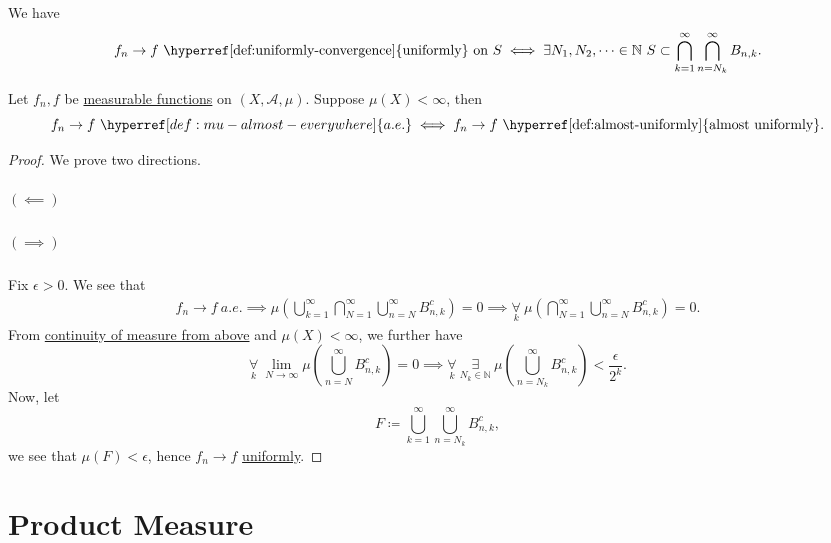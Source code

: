 \begin{lemma}
	We have
	\[
		f_{n}\to f \text{ \hyperref[def:uniformly-convergence]{uniformly} on } S \iff \exists N_1, N_2, \dots\in \mathbb{N}\ S\subset \bigcap_{k=1}^{\infty} \bigcap_{n=N_k}^{\infty} B_{n, k}.
	\]
\end{lemma}

\begin{theorem}\label{thm:Egorov}
	Let \(f_{n}, f\) be \hyperref[def:measurable-function]{measurable functions} on \((X, \mathcal{A} , \mu )\). Suppose \(\mu (X)<\infty \), then
	\[
		f_{n}\to f\ \hyperref[def:mu-almost-everywhere]{a.e.} \iff f_{n}\to f\text{ \hyperref[def:almost-uniformly]{almost uniformly}}.
	\]
\end{theorem}
\begin{proof}
	We prove two directions.
	\paragraph{\((\impliedby)\)}

	\paragraph{\((\implies )\)}
	Fix \(\epsilon > 0\). We see that
	\[
		\begin{split}
			f_{n}\to f\ \hyperref[def:mu-almost-everywhere]{a.e.}
			\implies \mu \left(\bigcup_{k=1}^{\infty} \bigcap_{N=1}^{\infty} \bigcup_{n=N}^{\infty} B_{n, k}^{c} \right) = 0
			\implies \underset{k}{\forall}\ \mu \left(\bigcap_{N=1}^{\infty} \bigcup_{n=N}^{\infty} B_{n, k}^{c} \right) = 0.
		\end{split}
	\]
	From \hyperref[thm:measure-space-continuity-from-above]{continuity of measure from above} and \(\mu (X)<\infty \), we further have
	\[
		\underset{k}{\forall}\ \lim_{N \to \infty} \mu \left(\bigcup_{n=N}^{\infty} B_{n, k}^{c} \right) = 0 \implies \underset{k}{\forall}\ \underset{ N_{k}\in\mathbb{N}}{\exists}\ \mu \left(\bigcup_{n=N_{k}}^{\infty} B_{n, k}^{c} \right)< \frac{\epsilon}{2^k}.
	\]
	Now, let
	\[
		F \coloneqq \bigcup_{k=1}^{\infty} \bigcup_{n=N_{k}}^{\infty} B_{n, k}^{c} ,
	\]
	we see that \(\mu (F) < \epsilon \), hence \(f_{n}\to f\) \hyperref[def:uniformly-convergence]{uniformly}.
\end{proof}

\chapter{Product Measure}\label{ch:Product-Measure}
